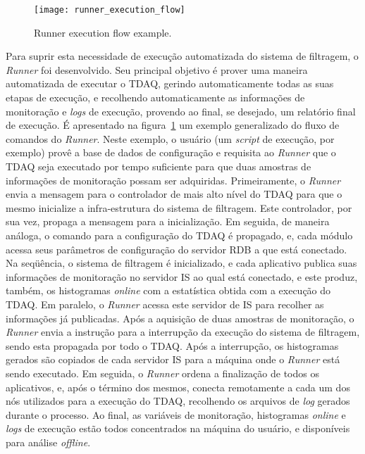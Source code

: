 \begin{figure}
\begin{center}
\texttt{[image: runner\_execution\_flow]}
\end{center}
\caption{Runner execution flow example.}
\label{fig:runner_exec_flow}
\end{figure}

Para suprir esta necessidade de execução automatizada do sistema de filtragem, o \emph{Runner} foi desenvolvido. Seu principal objetivo é prover uma maneira automatizada de executar o TDAQ, gerindo automaticamente todas as suas etapas de execução, e recolhendo automaticamente as informações de monitoração e \emph{logs} de execução, provendo ao final, se desejado, um relatório final de execução. É apresentado na figura~\ref{fig:runner_exec_flow} um exemplo generalizado do fluxo de comandos do \emph{Runner}. Neste exemplo, o usuário (um \emph{script} de execução, por exemplo) provê a base de dados de configuração e requisita ao \emph{Runner} que o TDAQ seja executado por tempo suficiente para que duas amostras de informações de monitoração possam ser adquiridas. Primeiramente, o \emph{Runner} envia a mensagem para o controlador de mais alto nível do TDAQ para que o mesmo inicialize a infra-estrutura do sistema de filtragem. Este controlador, por sua vez, propaga a mensagem para a inicialização. Em seguida, de maneira análoga, o comando para a configuração do TDAQ é propagado, e, cada módulo acessa seus parâmetros de configuração do servidor RDB a que está conectado. Na seqüência, o sistema de filtragem é inicializado, e cada aplicativo publica suas informações de monitoração no servidor IS ao qual está conectado, e este produz, também, os histogramas \emph{online} com a estatística obtida com a execução do TDAQ. Em paralelo, o \emph{Runner} acessa este servidor de IS para recolher as informações já publicadas. Após a aquisição de duas amostras de monitoração, o \emph{Runner} envia a instrução para a interrupção da execução do sistema de filtragem, sendo esta propagada por todo o TDAQ. Após a interrupção, os histogramas gerados são copiados de cada servidor IS para a máquina onde o \emph{Runner} está sendo executado. Em seguida, o \emph{Runner} ordena a finalização de todos os aplicativos, e, após o término dos mesmos, conecta remotamente a cada um dos nós utilizados para a execução do TDAQ, recolhendo os arquivos de \emph{log} gerados durante o processo. Ao final, as variáveis de monitoração, histogramas \emph{online} e \emph{logs} de execução estão todos concentrados na máquina do usuário, e disponíveis para análise \emph{offline}.

